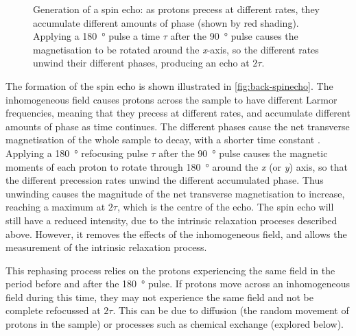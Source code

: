 \begin{figure}[t]
\centering
{}
\caption[Generation of a Spin echo]{Generation of a spin echo: as protons precess at different rates, they accumulate different amounts of phase (shown by red shading). Applying a \SI{180}{\degree} pulse a time $\tau$ after the \SI{90}{\degree} pulse causes the magnetisation to be rotated around the \textit{x}-axis, so the different rates unwind their different phases, producing an echo at $2\tau$.}
\label{fig:back-spinecho}
\end{figure}

The formation of the spin echo is shown illustrated in \autoref{fig:back-spinecho}.
The inhomogeneous \Bzero field causes protons across the sample to have different Larmor frequencies, meaning that they precess at different rates, and accumulate different amounts of phase as time continues.
The different phases cause the net transverse magnetisation of the whole sample to decay, with a shorter time constant \Ttwostar.
Applying a \SI{180}{\degree} refocusing pulse $\tau$ after the \SI{90}{\degree} pulse causes the magnetic moments of each proton to rotate through \SI{180}{\degree} around the \textit{x} (or \textit{y}) axis, so that the different precession rates unwind the different accumulated phase.
Thus unwinding causes the magnitude of the net transverse magnetisation to increase, reaching a maximum at $2\tau$, which is the centre of the echo.
The spin echo will still have a reduced intensity, due to the intrinsic \Ttwo relaxation proceses described above.
However, it removes the effects of the inhomogeneous \Bzero field, and allows the measurement of the intrinsic \Ttwo relaxation process.

This rephasing process relies on the protons experiencing the same \Bzero field in the period before and after the \SI{180}{\degree} pulse.
If protons move across an inhomogeneous field during this time, they may not experience the same field and not be complete refocussed at $2\tau$.
This can be due to diffusion (the random movement of protons in the sample) or processes such as chemical exchange (explored below).

